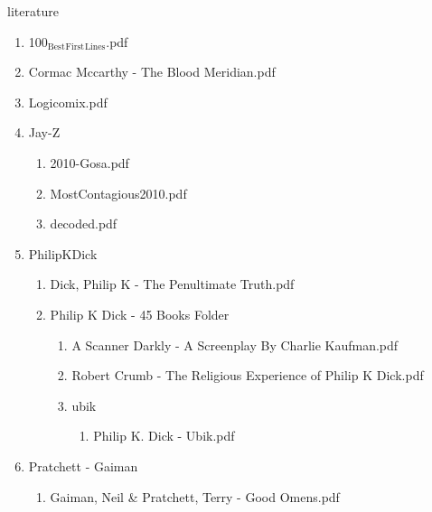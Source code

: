 \documentclass[11pt]{article}
\begin{document}
\item literature
\label{sec-1-1-1-1-28}
\begin{enumerate}
\item 100$_{\text{Best}}$$_{\text{First}}$$_{\text{Lines}}$.pdf
\label{sec-1-1-1-1-28-1}

\item Cormac Mccarthy - The Blood Meridian.pdf
\label{sec-1-1-1-1-28-2}

\item Logicomix.pdf
\label{sec-1-1-1-1-28-3}

\item Jay-Z
\label{sec-1-1-1-1-28-4}
\begin{enumerate}
\item 2010-Gosa.pdf
\label{sec-1-1-1-1-28-4-1}

\item MostContagious2010.pdf
\label{sec-1-1-1-1-28-4-2}

\item decoded.pdf
\label{sec-1-1-1-1-28-4-3}
\end{enumerate}

\item PhilipKDick
\label{sec-1-1-1-1-28-5}
\begin{enumerate}
\item Dick, Philip K - The Penultimate Truth.pdf
\label{sec-1-1-1-1-28-5-1}

\item Philip K Dick - 45 Books Folder
\label{sec-1-1-1-1-28-5-2}
\begin{enumerate}
\item A Scanner Darkly - A Screenplay By Charlie Kaufman.pdf
\label{sec-1-1-1-1-28-5-2-1}

\item Robert Crumb - The Religious Experience of Philip K Dick.pdf
\label{sec-1-1-1-1-28-5-2-2}

\item ubik
\label{sec-1-1-1-1-28-5-2-3}
\begin{enumerate}
\item Philip K. Dick - Ubik.pdf
\label{sec-1-1-1-1-28-5-2-3-1}
\end{enumerate}
\end{enumerate}
\end{enumerate}

\item Pratchett - Gaiman
\label{sec-1-1-1-1-28-6}
\begin{enumerate}
\item Gaiman, Neil \& Pratchett, Terry - Good Omens.pdf
\label{sec-1-1-1-1-28-6-1}
\end{enumerate}


\end{enumerate}
\end{document}
